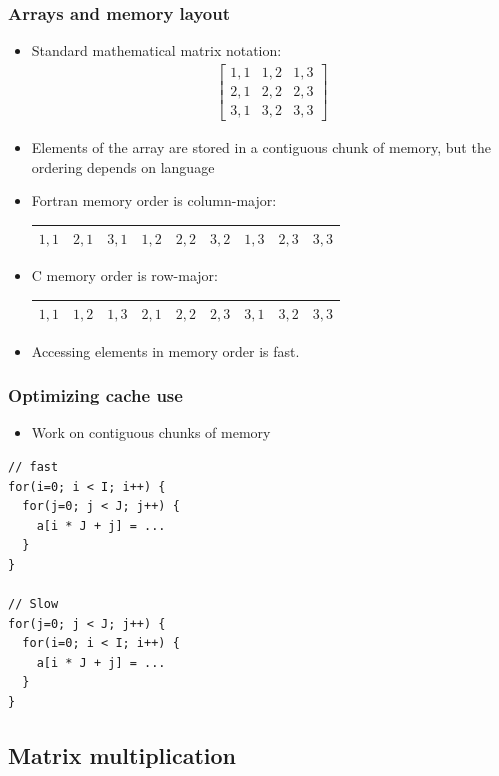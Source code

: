 \documentclass[usenames,dvipsnames,mathserif,compress]{beamer}
\begin{document}
\begin{frame}
  \frametitle{Arrays and memory layout}
  \begin{itemize}
  \item  Standard mathematical matrix notation:
  \begin{align}
    \left[
  \begin{matrix}
    1,1 & 1,2 & 1,3 \\
    2,1 & 2,2 & 2,3 \\
    3,1 & 3,2 & 3,3
  \end{matrix}
  \right]\nonumber
  \end{align}
\item Elements of the array are stored in a \alert{contiguous} chunk of memory,
  but the ordering depends on language
\item Fortran memory order is \alert{column-major}:
  \begin{tabular}{|c|c|c|c|c|c|c|c|c|}
    \hline
     $1,1$&$2,1$&$3,1$&$1,2$&$2,2$&$3,2$&$1,3$&$2,3$&$3,3$ \\\hline
  \end{tabular}
\item C memory order is \alert{row-major}:
  \begin{tabular}{|c|c|c|c|c|c|c|c|c|}
    \hline
     $1,1$&$1,2$&$1,3$&$2,1$&$2,2$&$2,3$&$3,1$&$3,2$&$3,3$ \\\hline
  \end{tabular}
\item Accessing elements in memory order is fast.
  \end{itemize}
\end{frame}

\begin{frame}[fragile]
  \frametitle{Optimizing cache use}
  \begin{itemize}
  \item Work on contiguous chunks of memory
  \end{itemize}
\begin{lstlisting}
// fast
for(i=0; i < I; i++) {
  for(j=0; j < J; j++) {
    a[i * J + j] = ...
  }
}

// Slow
for(j=0; j < J; j++) {
  for(i=0; i < I; i++) {
    a[i * J + j] = ...
  }
}
\end{lstlisting}
\end{frame}

\subsection*{Matrix multiplication}
\end{document}
